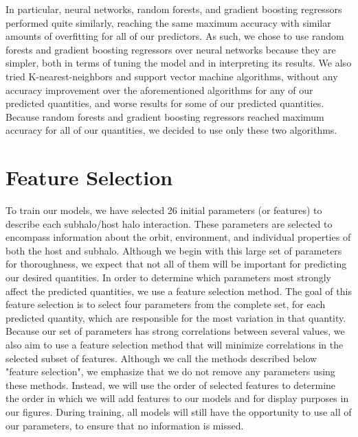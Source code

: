 \documentclass[fleqn,usenatbib]{mnras}
\begin{document}
In particular, neural networks, random forests, and gradient boosting regressors performed quite similarly, reaching the same maximum accuracy with similar amounts of overfitting for all of our predictors. As such, we chose to use random forests and gradient boosting regressors over neural networks because they are simpler, both in terms of tuning the model and in interpreting its results. We also tried K-nearest-neighbors and support vector machine algorithms, without any accuracy improvement over the aforementioned algorithms for any of our predicted quantities, and worse results for some of our predicted quantities. Because random forests and gradient boosting regressors reached maximum accuracy for all of our quantities, we decided to use only these two algorithms.

\section{Feature Selection}
\label{sec:feature selection} %
To train our models, we have selected 26 initial parameters (or features) to describe each subhalo/host halo interaction. These parameters are selected to encompass information about the orbit, environment, and individual properties of both the host and subhalo. Although we begin with this large set of parameters for thoroughness, we expect that not all of them will be important for predicting our desired quantities. In order to determine which parameters most strongly affect the predicted quantities, we use a feature selection method. The goal of this feature selection is to select four parameters from the complete set, for each predicted quantity, which are responsible for the most variation in that quantity. Because our set of parameters has strong correlations between several values, we also aim to use a feature selection method that will minimize correlations in the selected subset of features. Although we call the methods described below "feature selection", we emphasize that we do not remove any parameters using these methods. Instead, we will use the order of selected features to determine the order in which we will add features to our models and for display purposes in our figures. During training, all models will still have the opportunity to use all of our parameters, to ensure that no information is missed.
\end{document}
